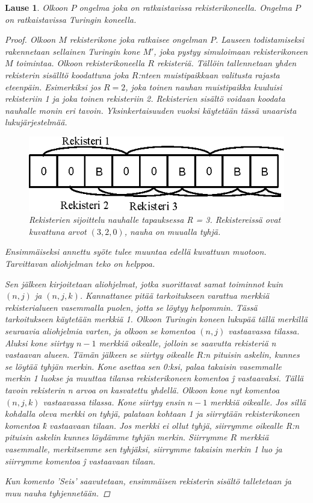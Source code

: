 \documentclass[a4paper, 12pt]{article}
\theoremstyle{definition}
\theoremstyle{plain}
\newtheorem{teor}[mydef]{Lause}
\begin{document}
\begin{teor}
\label{teor:regtur}
Olkoon $P$ ongelma joka on ratkaistavissa rekisterikoneella. Ongelma $P$ on ratkaistavissa Turingin koneella.
\begin{proof}
Olkoon $M$ rekisterikone joka ratkaisee ongelman $P$. Lauseen todistamiseksi rakennetaan sellainen Turingin kone $M'$, joka pystyy simuloimaan rekisterikoneen $M$ toimintaa. Olkoon rekisterikoneella $R$ rekisteriä. Tällöin tallennetaan yhden rekisterin sisälltö koodattuna joka $R$:nteen muistipaikkaan valitusta rajasta eteenpäin. Esimerkiksi jos $R = 2$, joka toinen nauhan muistipaikka kuuluisi rekisteriin 1 ja joka toinen rekisteriin 2. Rekisterien sisältö voidaan koodata nauhalle monin eri tavoin. Yksinkertaisuuden vuoksi käytetään tässä unaarista lukujärjestelmää.

\begin{figure}[H]
\begin{center}
\includegraphics{graph4b.eps}
\caption{Rekisterien sijoittelu nauhalle tapauksessa R = 3. Rekistereissä ovat kuvattuna arvot $(3, 2, 0)$, nauha on muualla tyhjä.}
\end{center}
\end{figure}

Ensimmäiseksi annettu syöte tulee muuntaa edellä kuvattuun muotoon. Tarvittavan aliohjelman teko on helppoa.

Sen jälkeen kirjoitetaan aliohjelmat, jotka suorittavat samat toiminnot kuin $(n, j)$ ja $(n, j, k)$. Kannattanee pitää tarkoitukseen varattua merkkiä rekisterialueen vasemmalla puolen, jotta se löytyy helpommin. Tässä tarkoitukseen käytetään merkkiä 1. Olkoon Turingin koneen lukupää tällä merkillä seuraavia aliohjelmia varten, ja olkoon se komentoa $(n, j)$ vastaavassa tilassa. Aluksi kone siirtyy $n-1$ merkkiä oikealle, jolloin se saavutta rekisteriä n vastaavan alueen. Tämän jälkeen se siirtyy oikealle $R$:n pituisin askelin, kunnes se löytää tyhjän merkin. Kone asettaa sen 0:ksi, palaa takaisin vasemmalle merkin 1 luokse ja muuttaa tilansa rekisterikoneen komentoa \^j vastaavaksi. Tällä tavoin rekisterin n arvoa on kasvatettu yhdellä. Olkoon kone nyt komentoa $(n, j, k)$ vastaavassa tilassa. Kone siirtyy ensin $n - 1$ merkkiä oikealle. Jos sillä kohdalla oleva merkki on tyhjä, palataan kohtaan 1 ja siirrytään rekisterikoneen komentoa \^k vastaavaan tilaan. Jos merkki ei ollut tyhjä, siirrymme oikealle R:n pituisin askelin kunnes löydämme tyhjän merkin. Siirrymme $R$ merkkiä vasemmalle, merkitsemme sen tyhjäksi, siirrymme takaisin merkin 1 luo ja siirrymme komentoa \^j vastaavaan tilaan.

Kun komento 'Seis' saavutetaan, ensimmäisen rekisterin sisältö talletetaan ja muu nauha tyhjennetään.

\qedhere
\end{proof}
\end{teor}
\end{document}
